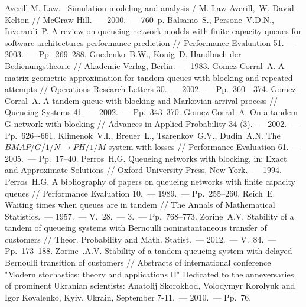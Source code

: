 \documentclass[11pt]{ubs}
\begin{document}
\begin{thebibliography}{100}
 Averill M. Law.  Simulation modeling and analysis / M. Law Averill, W. David Kelton // McGraw-Hill.~--- 2000.~--- 760~p.
 Balsamo~S., Persone~V.D.N., Inverardi~P. A review on queueing network models with finite capacity queues for software architectures performance prediction // Performance Evaluation 51.~--- 2003.~--- Pp.~269--288.
 Gnedenko~B.W., Konig~D. Handbuch der Bedienungstheorie // Akademie Verlag, Berlin.~--- 1983.
 Gomez-Corral~A. A matrix-geometric approximation for tandem queues with blocking and repeated attempts // Operations Research Letters  30.~--- 2002.~--- Pp.~360---374.
 Gomez-Corral~A. A tandem queue with blocking and Markovian arrival process // Queueing Systems 41.~--- 2002.~--- Pp.~343--370. 
 Gomez-Corral~A. On a tandem G-network with blocking // Advances in Applied Probability 34 (3).~--- 2002.~--- Pp.~626–-661.
 Klimenok~V.I., Breuer~L., Tsarenkov~G.V., Dudin~A.N. The $BMAP/G/1/N \to PH/1/M$ system with losses // Performance Evaluation 61.~--- 2005.~--- Pp.~17--40.
 Perros~H.G.  Queueing networks with blocking, in: Exact and Approximate Solutions // Oxford University Press, New York.~--- 1994. 
 Perros~H.G. A bibliography of papers on queueing networks with finite capacity queues // Performance Evaluation 10.~--- 1989.~--- Pp.~255--260.
 Reich~E.  Waiting times when queues are in tandem // The Annals of Mathematical Statistics.~--- 1957.~--- V.~28.~--- \No{}3.~--- Pp.~768--773.
 Zorine~A.V. Stability of a tandem of queueing systems with Bernoulli noninstantaneous transfer of customers // Theor. Probability and Math. Statist.~--- 2012.~--- V.~84.~--- Pp.~173--188.
 Zorine~.A.V. Stability of a tandem queueing system with delayed Bernoulli transition of customers // Abstracts of international conference "Modern stochastics: theory and applications II" Dedicated to the anneversaries of prominent Ukranian scientists: Anatolij Skorokhod, Volodymyr Korolyuk and Igor Kovalenko, Kyiv, Ukrain, September 7-11.~--- 2010.~--- Pp.~76.
\end{thebibliography}

\makeenginfo
\makeauxinfo
\end{document}
